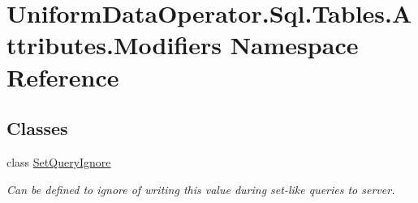 \hypertarget{namespace_uniform_data_operator_1_1_sql_1_1_tables_1_1_attributes_1_1_modifiers}{}\section{Uniform\+Data\+Operator.\+Sql.\+Tables.\+Attributes.\+Modifiers Namespace Reference}
\label{namespace_uniform_data_operator_1_1_sql_1_1_tables_1_1_attributes_1_1_modifiers}
\subsection*{Classes}
\begin{DoxyCompactItemize}
\item 
class \mbox{\hyperlink{class_uniform_data_operator_1_1_sql_1_1_tables_1_1_attributes_1_1_modifiers_1_1_set_query_ignore}{Set\+Query\+Ignore}}
\begin{DoxyCompactList}\small\item\em Can be defined to ignore of writing this value during set-\/like queries to server. \end{DoxyCompactList}\end{DoxyCompactItemize}
